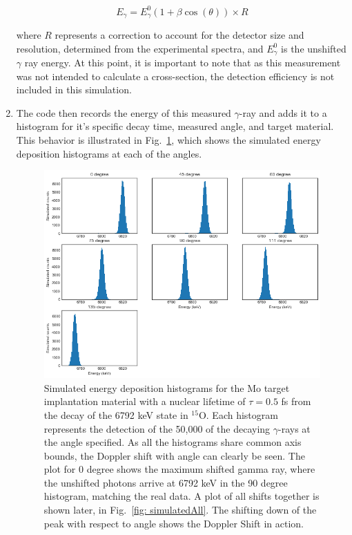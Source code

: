 \begin{enumerate}
\begin{equation}
E_{\gamma} = E_{\gamma}^{0} ( 1 + \beta \cos (\theta)) \times R
\label{eqn: doppSim}
\end{equation}

\noindent where $R$ represents a correction to account for the detector size and resolution, determined from the experimental spectra, and $E_{\gamma}^{0}$ is the unshifted $\gamma$ ray energy. At this point, it is important to note that as this measurement was not intended to calculate a cross-section, the detection efficiency is not included in this simulation. 
\item The code then records the energy of this measured $\gamma$-ray and adds it to a histogram for it's specific decay time, measured angle, and target material. This behavior is illustrated in Fig.\ \ref{fig: simulatedSingle}, which shows the simulated energy deposition histograms at each of the angles.

\begin{figure}
\centering
\includegraphics[width=\linewidth]{figures/simulatedSingle.png}
\caption{Simulated energy deposition histograms for the Mo target implantation material with a nuclear lifetime of $\tau=0.5$ fs from the decay of the 6792 keV state in $^{15}$O. Each histogram represents the detection of the 50,000 of the decaying $\gamma$-rays at the angle specified. As all the histograms share common axis bounds, the Doppler shift with angle can clearly be seen. The plot for 0 degree shows the maximum shifted gamma ray, where the unshifted photons arrive at 6792 keV in the 90 degree histogram, matching the real data. A plot of all shifts together is shown later, in Fig.\ \ref{fig: simulatedAll}. The shifting down of the peak with respect to angle shows the Doppler Shift in action.}
\label{fig: simulatedSingle}
\end{figure}


\end{enumerate}
